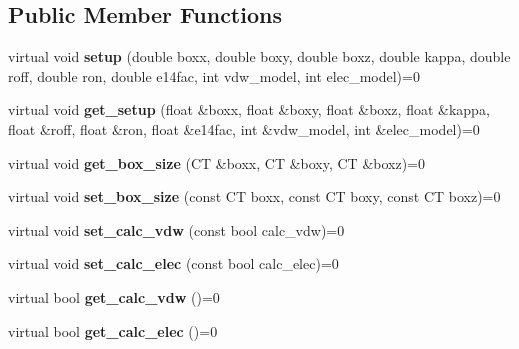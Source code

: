 \subsection*{Public Member Functions}
\begin{DoxyCompactItemize}
\item 
\hypertarget{classCudaPMEDirectForceBase_a6e4bda7a4b887057ef166501efe1f5e3}{}\label{classCudaPMEDirectForceBase_a6e4bda7a4b887057ef166501efe1f5e3} 
virtual void {\bfseries setup} (double boxx, double boxy, double boxz, double kappa, double roff, double ron, double e14fac, int vdw\+\_\+model, int elec\+\_\+model)=0
\item 
\hypertarget{classCudaPMEDirectForceBase_afdbb13017b16e7badb33879a86e4b29b}{}\label{classCudaPMEDirectForceBase_afdbb13017b16e7badb33879a86e4b29b} 
virtual void {\bfseries get\+\_\+setup} (float \&boxx, float \&boxy, float \&boxz, float \&kappa, float \&roff, float \&ron, float \&e14fac, int \&vdw\+\_\+model, int \&elec\+\_\+model)=0
\item 
\hypertarget{classCudaPMEDirectForceBase_ace3a0538a11e847c206ca907930632ba}{}\label{classCudaPMEDirectForceBase_ace3a0538a11e847c206ca907930632ba} 
virtual void {\bfseries get\+\_\+box\+\_\+size} (CT \&boxx, CT \&boxy, CT \&boxz)=0
\item 
\hypertarget{classCudaPMEDirectForceBase_a79cecb72fc19f3cba6c56ea70188da9a}{}\label{classCudaPMEDirectForceBase_a79cecb72fc19f3cba6c56ea70188da9a} 
virtual void {\bfseries set\+\_\+box\+\_\+size} (const CT boxx, const CT boxy, const CT boxz)=0
\item 
\hypertarget{classCudaPMEDirectForceBase_a0c8f1fd6e11240463530a906b1a0d260}{}\label{classCudaPMEDirectForceBase_a0c8f1fd6e11240463530a906b1a0d260} 
virtual void {\bfseries set\+\_\+calc\+\_\+vdw} (const bool calc\+\_\+vdw)=0
\item 
\hypertarget{classCudaPMEDirectForceBase_ae8ea0ffc4fa34fa947cdace047111ea3}{}\label{classCudaPMEDirectForceBase_ae8ea0ffc4fa34fa947cdace047111ea3} 
virtual void {\bfseries set\+\_\+calc\+\_\+elec} (const bool calc\+\_\+elec)=0
\item 
\hypertarget{classCudaPMEDirectForceBase_a5bf42c88ac2bc32723eb538a523b3aad}{}\label{classCudaPMEDirectForceBase_a5bf42c88ac2bc32723eb538a523b3aad} 
virtual bool {\bfseries get\+\_\+calc\+\_\+vdw} ()=0
\item 
\hypertarget{classCudaPMEDirectForceBase_a9144d91225fcd7c84a9fe1a56b25119a}{}\label{classCudaPMEDirectForceBase_a9144d91225fcd7c84a9fe1a56b25119a} 
virtual bool {\bfseries get\+\_\+calc\+\_\+elec} ()=0

\end{DoxyCompactItemize}
